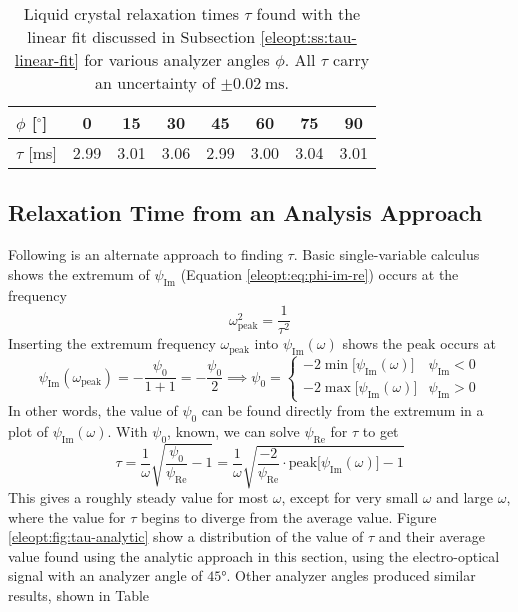 \documentclass[11pt, a4paper]{article}
\begin{document}
\begin{table}
\centering
\begin{tabular}{l|c|c|c|c|c|c|c}
	$ \phi $ [$ ^{\circ} $] & 0 & 15 & 30 & 45 & 60 & 75 & 90\\
		\hline
	$ \tau $ [\si{\milli \second}] & 2.99 & 3.01 & 3.06 & 2.99 & 3.00 & 3.04 & 3.01\\
\end{tabular}
\caption{Liquid crystal relaxation times $ \tau $ found with the linear fit discussed in Subsection \ref{eleopt:ss:tau-linear-fit} for various analyzer angles $ \phi $. All $ \tau $ carry an uncertainty of $ \pm \SI{0.02}{\milli \second} $. }

\end{table}



\subsection{Relaxation Time from an Analysis Approach} \label{eleopt:ss:tau-analytic}
Following is an alternate approach to finding $ \tau $. Basic single-variable calculus shows the extremum of $ \psi_{\text{Im}} $ (Equation \ref{eleopt:eq:phi-im-re}) occurs at the frequency 
\begin{equation*}
	\omega_{\text{peak}}^{2} = \frac{1}{\tau^{2}}
\end{equation*}
Inserting the extremum frequency $ \omega_{\text{peak}} $ into $ \psi_{\text{Im}}(\omega) $ shows the peak occurs at
\begin{equation*}
	\psi_{\text{Im}}(\omega_{\text{peak}}) = - \frac{\psi_{0}}{1 + 1} = - \frac{\psi_{0}}{2} \implies \psi_{0} = 
	\begin{cases}
		- 2 \min \big[\psi_{\text{Im}}(\omega)\big] & \psi_{\text{Im}} < 0\\
		- 2 \max \big[\psi_{\text{Im}}(\omega)\big] & \psi_{\text{Im}} > 0
	\end{cases}
\end{equation*}
In other words, the value of $ \psi_{0} $ can be found directly from the extremum in a plot of $ \psi_{\text{Im}}(\omega) $. With $ \psi_{0} $, known, we can solve $ \psi_{\text{Re}} $ for $ \tau $ to get
\begin{equation*}
	\tau = \frac{1}{\omega} \sqrt{\frac{\psi_{0}}{\psi_{\text{Re}}} - 1} = \frac{1}{\omega} \sqrt{\frac{-2}{\psi_{\text{Re}}}\cdot \text{peak} \big[\psi_{\text{Im}}(\omega)\big] - 1} 
\end{equation*}
This gives a roughly steady value for most $ \omega $, except for very small $ \omega $ and large $ \omega $, where the value for $ \tau $  begins to diverge from the average value. Figure \ref{eleopt:fig:tau-analytic} show a distribution of the value of $ \tau $ and their average value found using the analytic approach in this section, using the electro-optical signal with an analyzer angle of $ \ang{45} $. Other analyzer angles produced similar results, shown in Table
\end{document}
